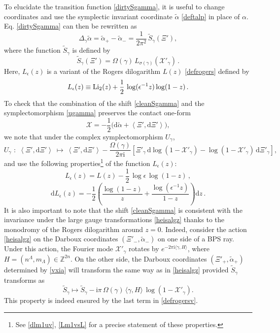 \documentclass[12pt,reqno]{article}
\numberwithin{equation}{section}
\newcommand{\be}{\begin{equation}}
\newcommand{\ee}{\end{equation}}
\def\eps{\varepsilon}
\def\tS{{\tilde S}}
\newcommand{\de}{\mathrm{d}}
\newcommand{\I}{\mathrm{i}}
\newcommand{\cX}{\mathcal{X}}
\newcommand{\stg}{{U}_\gamma}
\def\talp{\tilde\alpha}
\def\eps{\epsilon}
\numberwithin{equation}{section}
\begin{document}
To elucidate the transition function \eqref{dirtySgamma}, it is useful to change
coordinates and use the symplectic invariant coordinate $\talp$ \eqref{deftalp}
in place of $\alpha$. Eq. \eqref{dirtySgamma} can then be rewritten as
\be
\label{cleanSgamma}
\Delta_\gamma\talp = \talp_+ - \talp_-= \frac{1}{2\pi^2}\, \tS_\gamma(\Xi'),
\ee
where the function $\tS_\gamma$ is defined by
\be
\label{lga}
\tS_\gamma(\Xi') =  \Omega(\gamma) \, L_{\sigma(\gamma)}(\cX'_\gamma)\,  .
\ee
Here, $L_\eps(z) $ is a variant of the Rogers dilogarithm $L(z)$ \eqref{defrogers} defined by
\be
\label{defrogersv}
L_\eps(z) \equiv {\rm Li}_2(z)+\frac12\, \log (\eps^{-1} z) \log(1-z)\, .
\ee
To check that the combination of the shift \eqref{cleanSgamma} and the symplectomorphism
\eqref{ugamma} preserves the contact
one-form
\be
\cX=-\frac{1}{2}\Big(\de\tilde\alpha +\left<\Xi', \de\Xi'\right>\Big) ,
\label{holconnection}
\ee
we note that under the complex symplectomorphism $\stg$,
\be
\label{varconn}
\stg\, \,  :\,\,  \left<\Xi', \de\Xi'\right>\  \mapsto\
\left<\Xi', \de\Xi'\right>
- \frac{\Omega(\gamma)}{2\pi \I} \left[ \Xi'_\gamma \, \de \log(1-\cX'_\gamma)
-  \log(1-\cX'_\gamma) \, \de \Xi'_\gamma\right] ,
\ee
and use the following properties\footnote{See \eqref{dlm1uv}, \eqref{Lm1vsL} for a precise statement
of these properties.} of the function $L_\eps(z)$:
\be
L_\eps(z) = L(z) - \frac12\, \log\eps\, \log(1-z)\, ,
\ee
\be
\label{dlm1z}
\de L_\eps (z) = -\frac{1}{2} \left( \frac{\log(1-z)}{z} + \frac{\log (\eps^{-1} z)}{1-z} \right)\de z\, .
\ee
It is also important to note that the shift \eqref{cleanSgamma} is consistent with the
invariance under the large gauge transformations \eqref{heisalgz}
thanks to the monodromy of the Rogers dilogarithm around $z=0$.
Indeed, consider the action \eqref{heisalgz} on
the Darboux coordinates $(\Xi'_-,\talp_-)$  on one side of a BPS ray.
Under this action, the Fourier mode
$\cX'_{\gamma}$ rotates by $e^{-2\pi\I\langle\gamma,H\rangle}$, where $H=(n^{\Lambda}, m_\Lambda)\in \mathbb{Z}^{2n}$.
On the other side, the Darboux coordinates $(\Xi'_+,\talp_+)$ determined
by \eqref{vxia} will transform the same way as in \eqref{heisalgz} provided
$\tS_\gamma$ transforms as
\be
\tS_\gamma \mapsto \tS_\gamma -\I\pi\,  \Omega(\gamma) \,
\langle\gamma,H\rangle\, \log\left( 1- \cX'_\gamma \right)  .
\ee
This property is indeed ensured by the last term in \eqref{defrogersv}.
\end{document}
